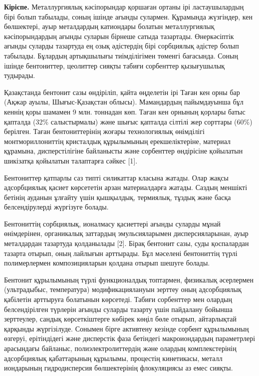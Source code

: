 \begin{multicols}{2}
{\bfseries Кіріспе.} Металлургиялық кәсіпорындар қоршаған ортаны ірі
ластаушылардың бірі болып табылады, соның ішінде ағынды сулармен.
Құрамында жүзгіндер, кен бөлшектері, ауыр металдардың катиондары болатын
металлургиялық кәсіпорындардың ағынды суларын бірнеше сатыда тазартады.
Өнеркәсіптік ағынды суларды тазартуда ең озық әдістердің бірі сорбциялық
әдістер болып табылады. Бұлардың артықшылығы тиімділігімен төменгі
бағасында. Соның ішінде бентониттер, цеолиттер сияқты табиғи сорбенттер
қызығушылық тудырады.

Қазақстанда бентонит сазы өндіріліп, қайта өңделетін ірі Таған кен орны
бар (Ақжар ауылы, Шығыс-Қазақстан облысы). Мамандардың пайымдауынша бұл
кеннің қоры шамамен 9 млн. тоннадан көп. Таған кен орнының қорлары батыс
қапталда (32\% салыстырмалы) және шығыс қапталда сілтілі жер сорттары
(60\%) берілген. Таған бентониттерінің жоғары технологиялық өнімділігі
монтмориллониттің кристалдық құрылымының ерекшеліктеріне, материал
құрамына, дисперстілігіне байланысты және сорбенттер өндірісіне
қойылатын шикізатқа қойылатын талаптарға сәйкес {[}1{]}.

Бентониттер қатпарлы саз типті силикаттар класына жатады. Олар жақсы
адсорбциялық қасиет көрсететін арзан материалдарға жатады. Саздың
меншікті бетінің ауданын ұлғайту үшін қышқылдық, термиялық, тұздық және
басқа белсендірулерді жүргізуге болады.

Бентониттің сорбциялық, ионалмасу қасиеттері ағынды суларды мұнай
өнімдерінен, органикалық заттардың эмульсияларымен дисперсияларынан,
ауыр металдардан тазартуда қолданылады {[}2{]}. Бірақ бентонит сазы,
суды қоспалардан тазарта отырып, оның лайлығын арттырады. Бұл мәселені
бентониттің түрлі полимерлермен композицияларын қолдана отырып шешуге
болады.

Бентонит құрылымының түрлі функционалдық топтармен, физикалық әсерлермен
(ультрадыбыс, температура) модификациялануын зерттеу оның адсорбциялық
қабілетін арттыруға болатынын көрсетеді. Табиғи сорбенттер мен олардың
белсендірілген түрлерін ағынды суларды тазарту үшін пайдалану бойынша
зерттеулер, сандық көрсеткіштерге көбірек көңіл бөле отырып, айтарлықтай
қарқынды жүргізілуде. Сонымен бірге активтену кезінде сорбент
құрылымының өзгеруі, ерітіндідегі және дисперстік фаза бетіндегі
макроиондардың параметрлері арасындағы байланыс, полиэлектролиттердің
және олардың комплекстерінің адсорбциялық қабаттарының құрылымы,
процестің кинетикасы, металл иондарының гидродисперсия бөлшектерінің
флокуляциясы аз емес сияқты.


\end{multicols}
